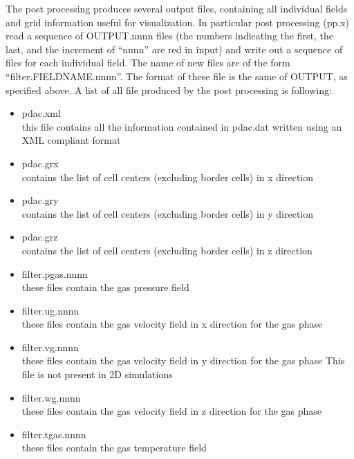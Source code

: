 The post processing produces several output files, 
containing all individual fields and grid information useful
for visualization.
In particular post processing (pp.x) read a sequence
of OUTPUT.nnnn files (the numbers indicating the first, the last, and
the increment of ``nnnn'' are red in input)
and write out a sequence of files for each individual field.
The name of new files are of the form ``filter.FIELDNAME.nnnn''.
The format of these file is the same of OUTPUT, as specified above.
A list of all file produced by the post processing is following:

\begin{itemize}

\item pdac.xml  \\
      this file contains all the information contained in pdac.dat
      written using an XML compliant format

\item pdac.grx \\
      contains the list of cell centers (excluding border cells) 
      in x direction

\item pdac.gry \\
      contains the list of cell centers (excluding border cells) 
      in y direction

\item pdac.grz \\
      contains the list of cell centers (excluding border cells) 
      in z direction

\item filter.pgas.nnnn \\
      these files contain the gas pressure field 

\item filter.ug.nnnn \\
      these files contain the gas velocity field in x direction
      for the gas phase

\item filter.vg.nnnn \\
      these files contain the gas velocity field in y direction
      for the gas phase
      This file is not present in 2D simulations

\item filter.wg.nnnn \\
      these files contain the gas velocity field in z direction
for the gas phase

\item filter.tgas.nnnn \\
      these files contain the gas temperature field 


\end{itemize}
